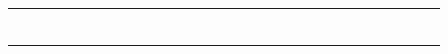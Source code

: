 \documentclass[10pt]{article}
\begin{document}
\begin{tabular}{|l|p{2.0cm}|p{2.0cm}|p{2.0cm}|l|p{0.8cm}|l|l|l|l|l|l|l|l|l|p{1.3cm}|l|l|l|l|l|l|l|l|l|l|l|}
\rule{0cm}{0.75cm} & \relax & \relax & \relax & \relax & \relax & \relax & & & & & & & & & & & & & & & & & & & & \\ \hline
\rule{0cm}{0.75cm} & \relax & \relax & \relax & \relax & \relax & \relax & & & & & & & & & & & & & & & & & & & & \\ \hline
\rule{0cm}{0.75cm} & \relax & \relax & \relax & \relax & \relax & \relax & & & & & & & & & & & & & & & & & & & & \\ \hline
\rule{0cm}{0.75cm} & \relax & \relax & \relax & \relax & \relax & \relax & & & & & & & & & & & & & & & & & & & & \\ \hline
\rule{0cm}{0.75cm} & \relax & \relax & \relax & \relax & \relax & \relax & & & & & & & & & & & & & & & & & & & & \\ \hline
\rule{0cm}{0.75cm} & \relax & \relax & \relax & \relax & \relax & \relax & & & & & & & & & & & & & & & & & & & & \\ \hline
\rule{0cm}{0.75cm} & \relax & \relax & \relax & \relax & \relax & \relax & & & & & & & & & & & & & & & & & & & & \\ \hline
\end{tabular}

\end{document}
